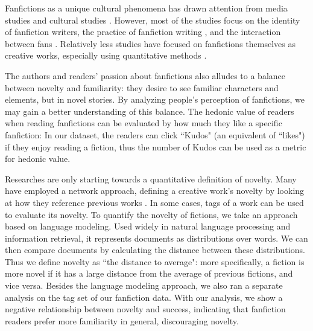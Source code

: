 \documentclass[a4paper]{article}
\begin{document}
Fanfictions as a unique cultural phenomena has drawn attention from media studies and cultural studies \cite{thomas2011fanfiction}. However, most of the studies focus on the identity of fanfiction writers\cite{black2006language}, the practice of fanfiction writing \cite{LIT:LIT12061}, and the interaction between fans \cite{hills2015expertise}. Relatively less studies have focused on fanfictions themselves as creative works, especially using quantitative methods\cite{zhaopredicting} \cite{yung2013market}.

The authors and readers' passion about fanfictions also alludes to a balance between novelty and familiarity: they desire to see familiar characters and elements, but in novel stories. By analyzing people's perception of fanfictions, we may gain a better understanding of this balance. The hedonic value of readers when reading fanfictions can be evaluated by how much they like a specific fanfiction:  In our dataset, the readers can click ``Kudos" (an equivalent of ``likes") if they enjoy reading a fiction, thus the number of Kudos can be used as a metric for hedonic value.

Researches are only starting towards a quantitative definition of novelty. Many have employed a network approach, defining a creative work's novelty by looking at how they reference previous works \cite{elgammal2015quantifying}\cite{wang2013quantifying}\cite{2017arXiv170704239I}. In some cases, tags of a work can be used to evaluate its novelty\cite{sreenivasan2013quantitative}. To quantify the novelty of fictions, we take an approach based on language modeling. Used widely in natural language processing and information retrieval\cite{jurafsky2000speech}\cite{Ponte:1998:LMA:290941.291008}, it represents documents as distributions over words. We can then compare documents by calculating the distance between these distributions. Thus we define novelty as ``the distance to average": more specifically, a fiction is more novel if it has a large distance from the average of previous fictions, and vice versa. Besides the language modeling approach, we also ran a separate analysis on the tag set of our fanfiction data. With our analysis, we show a negative relationship between novelty and success, indicating that fanfiction readers prefer more familiarity in general, discouraging novelty.
\end{document}
